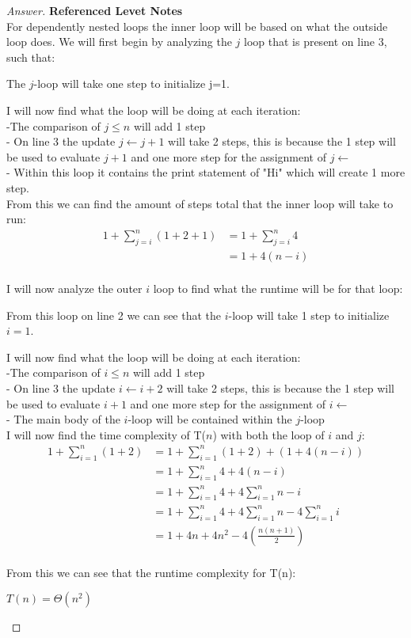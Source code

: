 \documentclass[11pt]{article}
\theoremstyle{definition}
\theoremstyle{definition}
\theoremstyle{definition}
\begin{document}
\begin{proof}[Answer] \textbf{Referenced Levet Notes} \\
For dependently nested loops the inner loop will be based on what the outside loop does.
We will first begin by analyzing the $j$ loop that is present on line 3, such that: \\
\begin{center}
The $j$-loop will take one step to initialize j=1.
\end{center}
I will now find what the loop will be doing at each iteration: \\
\indent -The comparison of $j\leq n$ will add 1 step \\
\indent - On line 3 the update $j \leftarrow j + 1$ will take 2 steps, this is because the 1 step will be used to evaluate $j + 1$ and \indent one more step for the assignment of $j \leftarrow$ \\
\indent - Within this loop it contains the print statement of "Hi" which will create 1 more step. \\
From this we can find the amount of steps total that the inner loop will take to run: \\
\begin{align*}
1 + \sum_{j=i}^{n} (1 + 2 + 1) &= 1 + \sum_{j=i}^{n}  4 \\
&= 1 + 4(n-i) \\
\end{align*}

I will now analyze the outer $i$ loop to find what the runtime will be for that loop: \\
\begin{center}
From this loop on line 2 we can see that the $i$-loop will take 1 step to initialize $i=1$. \\
\end{center}

I will now find what the loop will be doing at each iteration: \\
\indent -The comparison of $i\leq n$ will add 1 step \\
\indent - On line 3 the update $i \leftarrow i + 2$ will take 2 steps, this is because the 1 step will be used to evaluate $i + 1$ and \indent one more step for the assignment of $i \leftarrow$ \\
\indent - The main body of the $i$-loop will be contained within the $j$-loop \\
I will now find the time complexity of T($n$) with both the loop of $i$ and $j$: \\
\begin{align*}
1 + \sum_{i=1}^{n} (1 + 2 ) &= 1 + \sum_{i=1}^{n} (1 + 2 )+(1 + 4(n-i)) \\
&= 1 + \sum_{i=1}^{n} 4 + 4(n-i) \\
&= 1 +  \sum_{i=1}^{n} 4 +  4\sum_{i=1}^{n} n-i \\
&= 1 +  \sum_{i=1}^{n} 4 +  4\sum_{i=1}^{n} n - 4\sum_{i=1}^{n} i \\
&=1 + 4n + 4n^{2} - 4(\frac{n(n+1)}{2}) \\
\end{align*}

From this we can see that the runtime complexity for T(n): \\
\begin{center}
$T(n) = \Theta(n^2)$
\end{center}

\end{proof}
\end{document}
